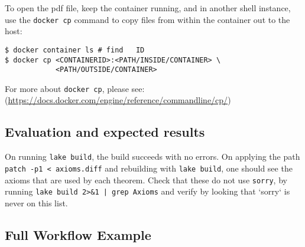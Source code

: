 \documentclass{sigplanconf}
\begin{document}
To open the pdf file, keep the container running, and in another
shell instance, use the \texttt{docker cp}
command to copy files from within the container out to the host:

\begin{verbatim}
$ docker container ls # find   ID
$ docker cp <CONTAINERID>:<PATH/INSIDE/CONTAINER> \
            <PATH/OUTSIDE/CONTAINER>
\end{verbatim}
For more about \texttt{docker cp}, please see:
(\url{https://docs.docker.com/engine/reference/commandline/cp/})


\subsection{Evaluation and expected results}

On running \texttt{lake build}, the build succeeds with no errors.
On applying the path \texttt{patch -p1 < axioms.diff} and rebuilding with \texttt{lake build},
one should see the axioms that are used by each theorem. Check that these do not use \texttt{sorry},
by running \texttt{lake build 2>\&1 | grep Axioms} and verify by looking that `sorry` is never on this list.


\subsection{Full Workflow Example}

% 
% 
% 



\end{document}
